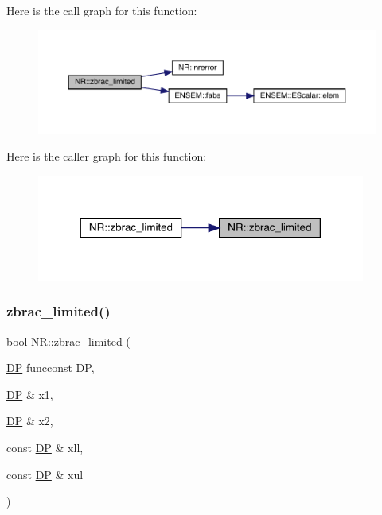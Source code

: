 Here is the call graph for this function\+:
\nopagebreak
\begin{figure}[H]
\begin{center}
\leavevmode
\includegraphics[width=350pt]{da/d46/namespaceNR_a01001dd7f12b7d7ef40d7b3f77bc84e7_cgraph}
\end{center}
\end{figure}
Here is the caller graph for this function\+:
\nopagebreak
\begin{figure}[H]
\begin{center}
\leavevmode
\includegraphics[width=306pt]{da/d46/namespaceNR_a01001dd7f12b7d7ef40d7b3f77bc84e7_icgraph}
\end{center}
\end{figure}
\mbox{\label{namespaceNR_a843139adc6ba0089d6840b84ea7e935a}} 
\subsubsection{\texorpdfstring{zbrac\_limited()}{zbrac\_limited()}\hspace{0.1cm}{\footnotesize\ttfamily [2/2]}}
{\footnotesize\ttfamily bool N\+R\+::zbrac\+\_\+limited (\begin{DoxyParamCaption}\item[{\mbox{\hyperlink{namespaceNR_af6ff762dd605ff477b8e52387253a02a}{DP}} }]{funcconst DP,  }\item[{\mbox{\hyperlink{namespaceNR_af6ff762dd605ff477b8e52387253a02a}{DP}} \&}]{x1,  }\item[{\mbox{\hyperlink{namespaceNR_af6ff762dd605ff477b8e52387253a02a}{DP}} \&}]{x2,  }\item[{const \mbox{\hyperlink{namespaceNR_af6ff762dd605ff477b8e52387253a02a}{DP}} \&}]{xll,  }\item[{const \mbox{\hyperlink{namespaceNR_af6ff762dd605ff477b8e52387253a02a}{DP}} \&}]{xul }\end{DoxyParamCaption})}

